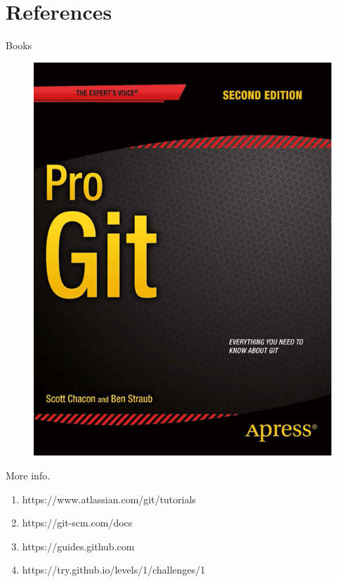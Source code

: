 \documentclass{beamer}
\begin{document}
\section{References}
\begin{frame}{Books}
    \begin{figure}
        \includegraphics[height=.6\textheight]{progit}
        \label{fig:book-progit}
    \end{figure}
\end{frame}

\begin{frame}{More info.}
    \begin{enumerate}
        \item https://www.atlassian.com/git/tutorials
        \item https://git-scm.com/docs
        \item https://guides.github.com
        \item https://try.github.io/levels/1/challenges/1
    \end{enumerate}
\end{frame}
\end{document}

